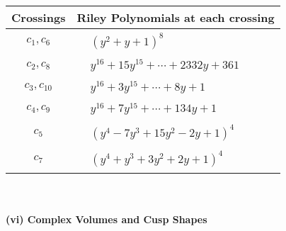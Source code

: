 \documentclass[1p]{elsarticle_modified}
\theoremstyle{definition}
\begin{document}
\begin{tabular}{m{50pt}|m{274pt}}
Crossings & \hspace{64pt}Riley Polynomials at each crossing \\
\hline $$\begin{aligned}c_{1},c_{6}\end{aligned}$$&$\begin{aligned}
&(y^2+y+1)^8
\end{aligned}$\\
\hline $$\begin{aligned}c_{2},c_{8}\end{aligned}$$&$\begin{aligned}
&y^{16}+15 y^{15}+\cdots+2332 y+361
\end{aligned}$\\
\hline $$\begin{aligned}c_{3},c_{10}\end{aligned}$$&$\begin{aligned}
&y^{16}+3 y^{15}+\cdots+8 y+1
\end{aligned}$\\
\hline $$\begin{aligned}c_{4},c_{9}\end{aligned}$$&$\begin{aligned}
&y^{16}+7 y^{15}+\cdots+134 y+1
\end{aligned}$\\
\hline $$\begin{aligned}c_{5}\end{aligned}$$&$\begin{aligned}
&(y^4-7 y^3+15 y^2-2 y+1)^4
\end{aligned}$\\
\hline $$\begin{aligned}c_{7}\end{aligned}$$&$\begin{aligned}
&(y^4+y^3+3 y^2+2 y+1)^4
\end{aligned}$\\
\hline
\end{tabular}\\~\\
\newpage\flushleft \textbf{(vi) Complex Volumes and Cusp Shapes}
\end{document}
